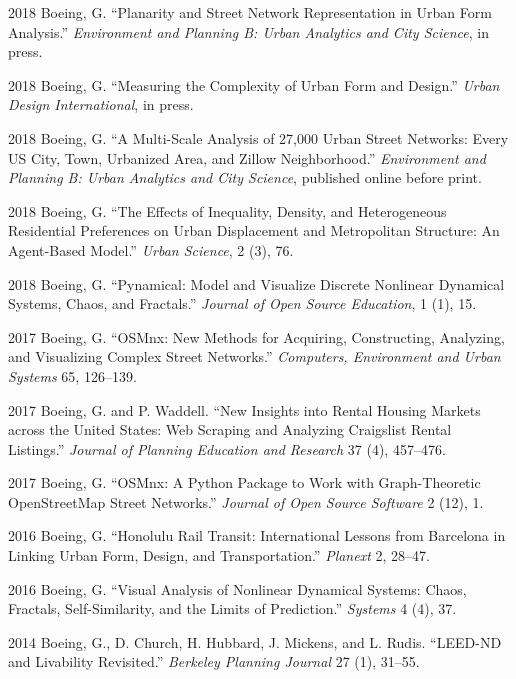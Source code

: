 \documentclass[12pt,letterpaper]{report}
\begin{document}
\begin{tablist}
	
\item[2018] \tab Boeing, G. \enquote{Planarity and Street Network Representation in Urban Form Analysis.} \textit{Environment and Planning B: Urban Analytics and City Science}, in press.

\item[2018] \tab Boeing, G. \enquote{Measuring the Complexity of Urban Form and Design.} \textit{Urban Design International}, in press.
		
\item[2018] \tab Boeing, G. \enquote{A Multi-Scale Analysis of 27,000 Urban Street Networks: Every US City, Town, Urbanized Area, and Zillow Neighborhood.} \textit{Environment and Planning B: Urban Analytics and City Science}, published online before print.

\item[2018] \tab Boeing, G. \enquote{The Effects of Inequality, Density, and Heterogeneous Residential Preferences on Urban Displacement and Metropolitan Structure: An Agent-Based Model.} \textit{Urban Science}, 2 (3), 76.

\item[2018] \tab Boeing, G. \enquote{Pynamical: Model and Visualize Discrete Nonlinear Dynamical Systems, Chaos, and Fractals.} \textit{Journal of Open Source Education}, 1 (1), 15.

\item[2017] \tab Boeing, G. \enquote{OSMnx: New Methods for Acquiring, Constructing, Analyzing, and Visualizing Complex Street Networks.} \textit{Computers, Environment and Urban Systems} 65, 126--139.

\item[2017] \tab Boeing, G. and P. Waddell. \enquote{New Insights into Rental Housing Markets across the United States: Web Scraping and Analyzing Craigslist Rental Listings.} \textit{Journal of Planning Education and Research} 37 (4), 457--476.

\item[2017] \tab Boeing, G. \enquote{OSMnx: A Python Package to Work with Graph-Theoretic OpenStreetMap Street Networks.} \textit{Journal of Open Source Software} 2 (12), 1.

\item[2016] \tab Boeing, G. \enquote{Honolulu Rail Transit: International Lessons from Barcelona in Linking Urban Form, Design, and Transportation.} \textit{Planext} 2, 28--47.

\item[2016] \tab Boeing, G. \enquote{Visual Analysis of Nonlinear Dynamical Systems: Chaos, Fractals, Self-Similarity, and the Limits of Prediction.} \textit{Systems} 4 (4), 37.

\item[2014] \tab Boeing, G., D. Church, H. Hubbard, J. Mickens, and L. Rudis. \enquote{LEED-ND and Livability Revisited.} \textit{Berkeley Planning Journal} 27 (1), 31--55.

\end{tablist}
\end{document}
